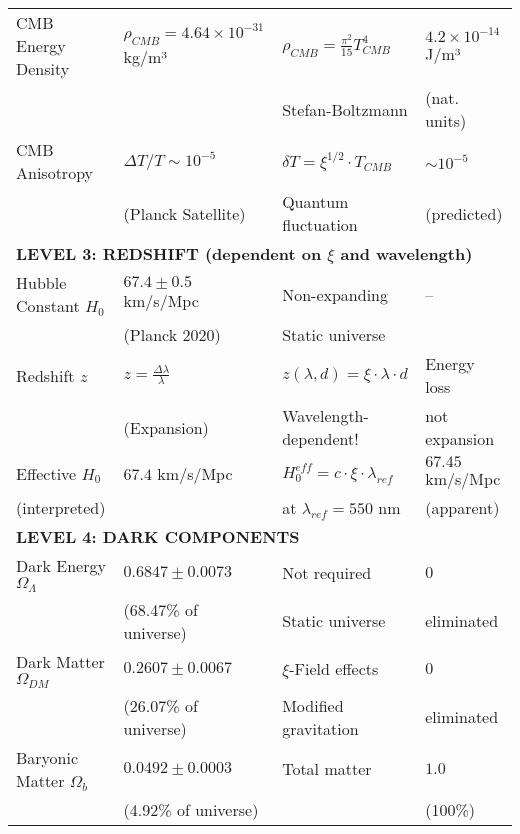 \documentclass[12pt,a4paper]{article}
\begin{document}
\begin{longtable}{p{4.5cm}p{3.5cm}p{3.5cm}p{3.5cm}}
		CMB Energy Density & $\rho_{CMB} = 4.64 \times 10^{-31}$ kg/m³ & $\rho_{CMB} = \frac{\pi^2}{15} T_{CMB}^4$ & $4.2 \times 10^{-14}$ J/m³ \\
		& & Stefan-Boltzmann & (nat. units) \\[0.3em]
		
		CMB Anisotropy & $\Delta T/T \sim 10^{-5}$ & $\delta T = \xi^{1/2} \cdot T_{CMB}$ & $\sim 10^{-5}$ \\
		& (Planck Satellite) & Quantum fluctuation & (predicted) \\[0.3em]
		
		\midrule
		\multicolumn{4}{l}{\textbf{LEVEL 3: REDSHIFT (dependent on $\xi$ and wavelength)}} \\
		\midrule
		
		Hubble Constant $H_0$ & $67.4 \pm 0.5$ km/s/Mpc & Non-expanding & -- \\
		& (Planck 2020) & Static universe & \\[0.3em]
		
		Redshift $z$ & $z = \frac{\Delta\lambda}{\lambda}$ & $z(\lambda, d) = \xi \cdot \lambda \cdot d$ & Energy loss \\
		& (Expansion) & Wavelength-dependent! & not expansion \\[0.3em]
		
		Effective $H_0$ & $67.4$ km/s/Mpc & $H_0^{eff} = c \cdot \xi \cdot \lambda_{ref}$ & $67.45$ km/s/Mpc \\
		(interpreted) & & at $\lambda_{ref} = 550$ nm & (apparent) \\[0.3em]
		
		\midrule
		\multicolumn{4}{l}{\textbf{LEVEL 4: DARK COMPONENTS}} \\
		\midrule
		
		Dark Energy $\Omega_\Lambda$ & $0.6847 \pm 0.0073$ & Not required & $0$ \\
		& (68.47\% of universe) & Static universe & eliminated \\[0.3em]
		
		Dark Matter $\Omega_{DM}$ & $0.2607 \pm 0.0067$ & $\xi$-Field effects & $0$ \\
		& (26.07\% of universe) & Modified gravitation & eliminated \\[0.3em]
		
		Baryonic Matter $\Omega_b$ & $0.0492 \pm 0.0003$ & Total matter & $1.0$ \\
		& (4.92\% of universe) & & (100\%) \\[0.3em]
		

\end{longtable}
\end{document}
